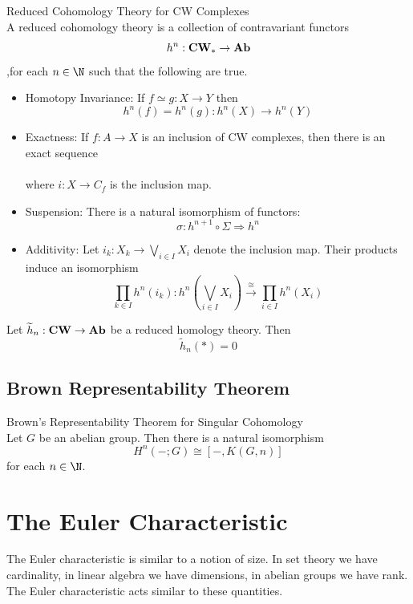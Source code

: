 \documentclass[a4paper]{article}
\begin{document}
\begin{defn}{Reduced Cohomology Theory for CW Complexes}{}\\
A reduced cohomology theory is a collection of contravariant functors $$h^n:\bold{CW}_\ast\to\bold{Ab}$$,for each $n\in\N$ such that the following are true. 
\begin{itemize}
\item Homotopy Invariance: If $f\simeq g:X\to Y$ then $$h^n(f)=h^n(g):h^n(X)\to h^n(Y)$$
\item Exactness: If $f:A\to X$ is an inclusion of CW complexes, then there is an exact sequence \\
\\
where $i:X\to C_f$ is the inclusion map. 
\item Suspension: There is a natural isomorphism of functors: $$\sigma:h^{n+1}\circ\Sigma\Rightarrow h^n$$
\item Additivity: Let $i_k:X_k\to\bigvee_{i\in I}X_i$ denote the inclusion map. Their products induce an isomorphism $$\prod_{k\in I}h^n(i_k):h^n\left(\bigvee_{i\in I}X_i\right)\overset{\cong}{\longrightarrow}\prod_{i\in I}h^n(X_i)$$
\end{itemize}
\end{defn}

\begin{lmm}{}{} Let $\widetilde{h}_n:\bold{CW}\to\bold{Ab}$ be a reduced homology theory. Then $$\widetilde{h}_n(\ast)=0$$
\end{lmm}

\subsection{Brown Representability Theorem}
\begin{thm}{Brown's Representability Theorem for Singular Cohomology}{}\\
Let $G$ be an abelian group. Then there is a natural isomorphism $$H^n(-;G)\cong[-,K(G,n)]$$ for each $n\in\N$. 
\end{thm}

\pagebreak
\section{The Euler Characteristic}
The Euler characteristic is similar to a notion of size. In set theory we have cardinality, in linear algebra we have dimensions, in abelian groups we have rank. The Euler characteristic acts similar to these quantities. 
\end{document}
